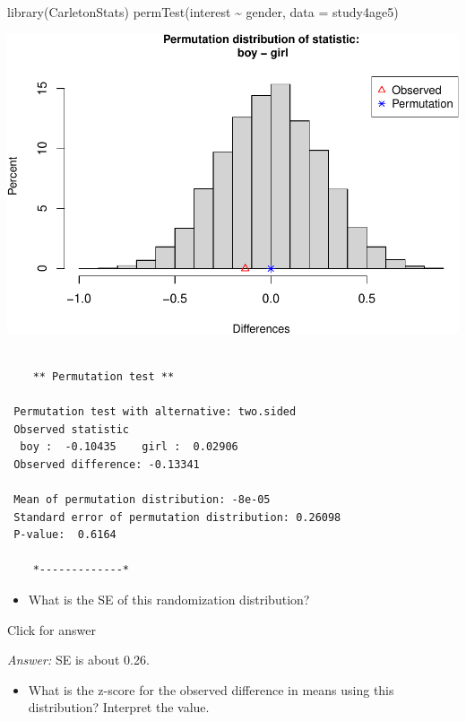 \documentclass[
]{book}
\newenvironment{Shaded}{\begin{snugshade}}{\end{snugshade}}
\newcommand{\AttributeTok}[1]{\textcolor[rgb]{0.77,0.63,0.00}{#1}}
\newcommand{\FunctionTok}[1]{\textcolor[rgb]{0.00,0.00,0.00}{#1}}
\newcommand{\NormalTok}[1]{#1}
\newcommand{\SpecialCharTok}[1]{\textcolor[rgb]{0.00,0.00,0.00}{#1}}
\providecommand{\tightlist}{%
  \setlength{\itemsep}{0pt}\setlength{\parskip}{0pt}}
\begin{document}
\begin{Shaded}
\begin{Highlighting}[]
\FunctionTok{library}\NormalTok{(CarletonStats)}
\FunctionTok{permTest}\NormalTok{(interest }\SpecialCharTok{\textasciitilde{}}\NormalTok{ gender, }\AttributeTok{data =}\NormalTok{ study4age5)}
\end{Highlighting}
\end{Shaded}

\includegraphics[width=1\linewidth]{Class_Activity_13_files/figure-latex/unnamed-chunk-2-2}

\begin{verbatim}

    ** Permutation test **

 Permutation test with alternative: two.sided 
 Observed statistic
  boy :  -0.10435    girl :  0.02906 
 Observed difference: -0.13341 

 Mean of permutation distribution: -8e-05 
 Standard error of permutation distribution: 0.26098 
 P-value:  0.6164 

    *-------------*
\end{verbatim}

\begin{itemize}
\tightlist
\item
  What is the SE of this randomization distribution?
\end{itemize}

Click for answer

\emph{Answer:} SE is about 0.26.

\begin{itemize}
\tightlist
\item
  What is the z-score for the observed difference in means using this distribution? Interpret the value.
\end{itemize}
\end{document}
